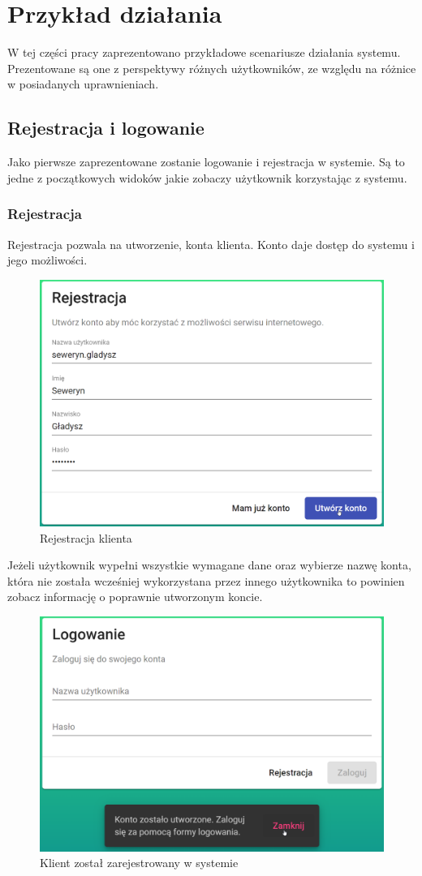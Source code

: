 \documentclass[a4paper,twoside,12pt]{book}
\begin{document}
\section {Przykład działania}
\label{UseExample}
W tej części pracy zaprezentowano przykładowe scenariusze działania systemu. Prezentowane są one z perspektywy różnych użytkowników, ze względu na różnice w posiadanych uprawnieniach.

\subsection{Rejestracja i logowanie}
Jako pierwsze zaprezentowane zostanie logowanie i rejestracja w systemie. Są to jedne z początkowych widoków jakie zobaczy użytkownik korzystając z systemu.
\subsubsection{Rejestracja}
Rejestracja pozwala na utworzenie, konta klienta. Konto daje dostęp do systemu i jego możliwości.
\begin{figure}[h!]
	\centering
	\includegraphics[width=1\linewidth]{../zrzuty_ekranu/dzialanie/rejestracja_logowanie/rejestracja}
	\caption{Rejestracja klienta}
	\label{fig:rejestracja}
\end{figure}
\FloatBarrier
Jeżeli użytkownik wypełni wszystkie wymagane dane oraz wybierze nazwę konta, która nie została wcześniej wykorzystana przez innego użytkownika to powinien zobacz informację o poprawnie utworzonym koncie.
\begin{figure}[h!]
	\centering
	\includegraphics[width=0.7\linewidth]{../zrzuty_ekranu/dzialanie/rejestracja_logowanie/konto_utworzone}
	\caption{Klient został zarejestrowany w systemie}
	\label{fig:kontoutworzone}
\end{figure}
\end{document}
